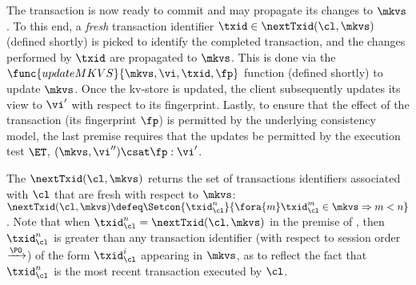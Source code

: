 The transaction is now ready to commit and may propagate its changes to $\mkvs$.
To this end, a \emph{fresh} transaction identifier $\txid \in \nextTxid(\cl, \mkvs)$ (defined shortly) is picked
to identify the completed transaction, and the changes performed by $\txid$ are propagated to $\mkvs$. 
This is done via the $\func{updateMKVS}{\mkvs, \vi, \txid, \fp}$ function (defined shortly) to update $\mkvs$. 
Once the kv-store is updated, the client subsequently updates its view to $\vi'$ with respect to its fingerprint. 
Lastly, to ensure that the effect of the transaction (its fingerprint  $\fp$) is permitted by the underlying consistency model, 
the last premise requires that the updates be permitted by the execution test $\ET$, \ie \( (\mkvs, \vi'') \csat \fp : \vi'\).

The $\nextTxid(\cl, \mkvs)$ returns the set of transactions identifiers associated with $\cl$ that are fresh with respect to $\mkvs$: 
$\nextTxid(\cl, \mkvs) \defeq \Setcon{\txid_{\cl}^{n}}{\fora{m} \txid_{\cl}^{m} \in \mkvs \Rightarrow m < n }$.
Note that when $\txid_\cl^n = \nextTxid(\cl, \mkvs)$ in the premise of , then $\txid_\cl^n$ is greater than any transaction identifier 
(with respect to session order $\xrightarrow{\PO}$) 
of the form $\txid_{\cl}^{i}$ appearing in $\mkvs$,
as to reflect the fact that $\txid_\cl^n$ is the most recent transaction executed by $\cl$.

